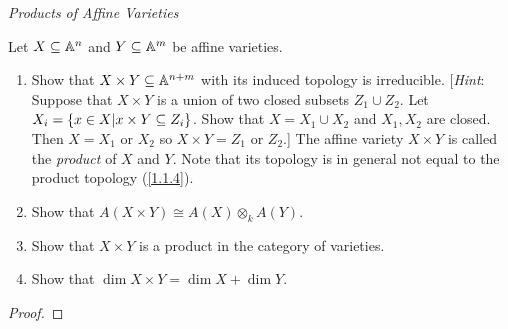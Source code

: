 \label{1.3.15}

\emph{Products of Affine Varieties}

Let $X \subseteq \mathbb A^n$ and $Y \subseteq \mathbb A^m$ be affine varieties.

\begin{enumerate}[label = (\alph*)]
    \item Show that $X \times Y \subseteq \mathbb A^{n + m}$ with its induced topology is irreducible. [\emph{Hint}: Suppose that $X \times Y$ is a union of two closed subsets $Z_1 \cup Z_2$. Let $X_i = {\left\{x \in X | x \times Y \subseteq Z_i\right\}}$. Show that $X = X_1 \cup X_2$ and $X_1, X_2$ are closed. Then $X = X_1$ or $X_2$ so $X \times Y = Z_1$ or $Z_2$.] The affine variety $X \times Y$ is called the \emph{product} of $X$ and $Y$. Note that its topology is in general not equal to the product topology (\ref{1.1.4}).

    \item Show that $A(X \times Y) \cong A(X) \otimes_k A(Y)$.

    \item Show that $X \times Y$ is a product in the category of varieties.

    \item Show that $\dim X \times Y = \dim X + \dim Y$.
\end{enumerate}

\begin{proof}

\end{proof}
